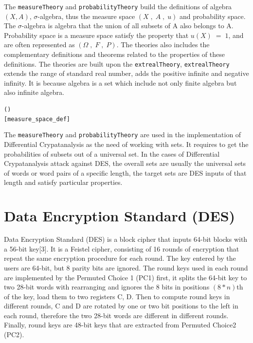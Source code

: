 \documentclass{article}
\begin{document}
The \verb|measureTheory| and \verb|probabilityTheory| build the definitions of algebra $(X,A)$, $\sigma$-algebra, thus the measure space
$(X\;,\;A\;,\;u)$ and probability
space. The $\sigma$-algebra is algebra that the union of all subsets of A also belongs to A. Probability space is a measure space satisfy the
property that $u(X)\;=\;1$, and are often represented as $(\Omega\;,\; F\;,\; P)$. The theories also includes the complementary definitions and
theorems related to the properties of these definitions. The theories are built upon the \verb|extrealTheory|, \verb|extrealTheory|
extends the range of standard real number, adds the positive infinite and negative infinity. It is because algebra is a set which
include not only finite algebra but also infinite algebra.

\begin{alltt}
\HOLTokenTurnstile{}   \HOLSymConst{\HOLTokenEquiv{}}
    ( ) \HOLSymConst{\HOLTokenConj{}}   \HOLSymConst{\HOLTokenConj{}}
    \hfill{[measure_space_def]}
\end{alltt}

The \verb|measureTheory| and \verb|probabilityTheory| are used in the implementation of Differential Crypatanalysis as the need of working with
sets. It requires to get the probabilities of subsets out of a universal set. In the cases of Differential Crypatanalysis attack against
DES, the overall sets are usually the universal sets of words or word pairs of a specific length, the target sets are DES
inputs of that length and satisfy particular properties.

\section{Data Encryption Standard (DES)}
Data Encryption Standard (DES) is a block cipher that inputs 64-bit blocks with a 56-bit key[3]. It is a Feistel cipher, consisting
of 16 rounds of encryption that repeat the same encryption procedure for each round. The key entered by the users are 64-bit, but 8
parity bits are ignored. The round keys used in each round are implemented
by the Permuted Choice 1 (PC1) first, it splits the 64-bit key to two 28-bit words with rearranging
and ignores the 8 bits in positions $(8*n)$th of the key, load them to two registers C, D. Then to compute round keys
in different rounds, C and D are rotated by
one or two bit positions to the left in each round, therefore the two 28-bit words are different in different rounds. Finally,
round keys are 48-bit keys that are extracted from Permuted Choice2 (PC2).
\end{document}
